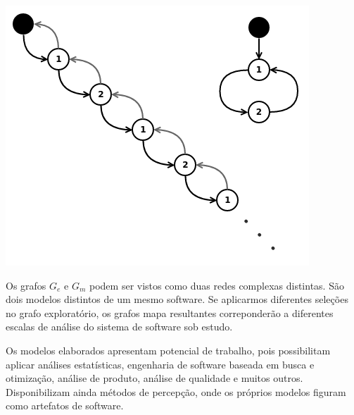 {
  \centering
  \captionsetup{type=figure}
	\includegraphics[width=\columnwidth]{./figures/Figure022-IndirectRecursion.png}
	\label{Figure021-IndirectRecursion}
}

Os grafos $G_e$ e $G_m$ podem ser vistos como duas redes complexas distintas.
São dois modelos distintos de um mesmo software. Se aplicarmos diferentes
seleções no grafo exploratório, os grafos mapa resultantes correponderão a
diferentes escalas de análise do sistema de software sob estudo.

Os modelos elaborados apresentam potencial de trabalho, pois possibilitam
aplicar análises estatísticas, engenharia de software baseada em busca e
otimização, análise de produto, análise de qualidade e muitos outros.
Disponibilizam ainda métodos de percepção, onde os próprios modelos figuram
como artefatos de software.
